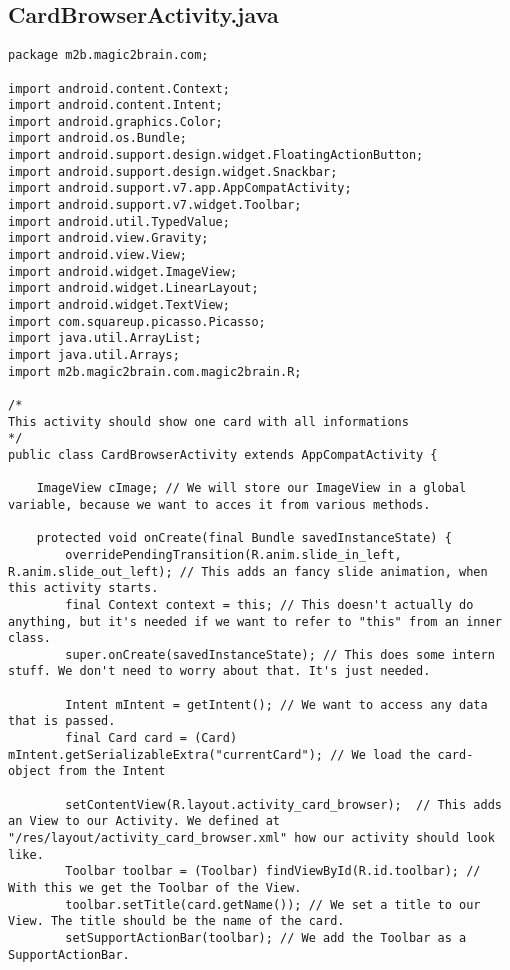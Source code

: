 \subsection*{CardBrowserActivity.java}
\begin{lstlisting}
package m2b.magic2brain.com;

import android.content.Context;
import android.content.Intent;
import android.graphics.Color;
import android.os.Bundle;
import android.support.design.widget.FloatingActionButton;
import android.support.design.widget.Snackbar;
import android.support.v7.app.AppCompatActivity;
import android.support.v7.widget.Toolbar;
import android.util.TypedValue;
import android.view.Gravity;
import android.view.View;
import android.widget.ImageView;
import android.widget.LinearLayout;
import android.widget.TextView;
import com.squareup.picasso.Picasso;
import java.util.ArrayList;
import java.util.Arrays;
import m2b.magic2brain.com.magic2brain.R;

/*
This activity should show one card with all informations
*/
public class CardBrowserActivity extends AppCompatActivity {

    ImageView cImage; // We will store our ImageView in a global variable, because we want to acces it from various methods.

    protected void onCreate(final Bundle savedInstanceState) {
        overridePendingTransition(R.anim.slide_in_left, R.anim.slide_out_left); // This adds an fancy slide animation, when this activity starts.
        final Context context = this; // This doesn't actually do anything, but it's needed if we want to refer to "this" from an inner class.
        super.onCreate(savedInstanceState); // This does some intern stuff. We don't need to worry about that. It's just needed.

        Intent mIntent = getIntent(); // We want to access any data that is passed.
        final Card card = (Card) mIntent.getSerializableExtra("currentCard"); // We load the card-object from the Intent

        setContentView(R.layout.activity_card_browser);  // This adds an View to our Activity. We defined at "/res/layout/activity_card_browser.xml" how our activity should look like.
        Toolbar toolbar = (Toolbar) findViewById(R.id.toolbar); // With this we get the Toolbar of the View.
        toolbar.setTitle(card.getName()); // We set a title to our View. The title should be the name of the card.
        setSupportActionBar(toolbar); // We add the Toolbar as a SupportActionBar.


\end{lstlisting}
